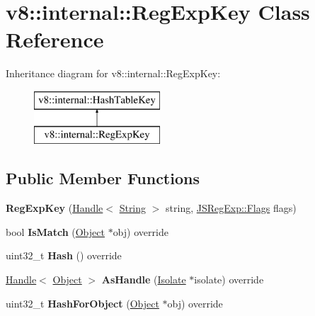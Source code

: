 \hypertarget{classv8_1_1internal_1_1_reg_exp_key}{}\section{v8\+:\+:internal\+:\+:Reg\+Exp\+Key Class Reference}
\label{classv8_1_1internal_1_1_reg_exp_key}
Inheritance diagram for v8\+:\+:internal\+:\+:Reg\+Exp\+Key\+:\begin{figure}[H]
\begin{center}
\leavevmode
\includegraphics[height=2.000000cm]{classv8_1_1internal_1_1_reg_exp_key}
\end{center}
\end{figure}
\subsection*{Public Member Functions}
\begin{DoxyCompactItemize}
\item 
{\bfseries Reg\+Exp\+Key} (\hyperlink{classv8_1_1internal_1_1_handle}{Handle}$<$ \hyperlink{classv8_1_1internal_1_1_string}{String} $>$ string, \hyperlink{classv8_1_1base_1_1_flags}{J\+S\+Reg\+Exp\+::\+Flags} flags)\hypertarget{classv8_1_1internal_1_1_reg_exp_key_a246a71b4ad1895699c71d654d56083b3}{}\label{classv8_1_1internal_1_1_reg_exp_key_a246a71b4ad1895699c71d654d56083b3}

\item 
bool {\bfseries Is\+Match} (\hyperlink{classv8_1_1internal_1_1_object}{Object} $\ast$obj) override\hypertarget{classv8_1_1internal_1_1_reg_exp_key_ad1255b383684119037cff47aa028d6fb}{}\label{classv8_1_1internal_1_1_reg_exp_key_ad1255b383684119037cff47aa028d6fb}

\item 
uint32\+\_\+t {\bfseries Hash} () override\hypertarget{classv8_1_1internal_1_1_reg_exp_key_a41c6f08f7503b0ea0464bb5bfe8993be}{}\label{classv8_1_1internal_1_1_reg_exp_key_a41c6f08f7503b0ea0464bb5bfe8993be}

\item 
\hyperlink{classv8_1_1internal_1_1_handle}{Handle}$<$ \hyperlink{classv8_1_1internal_1_1_object}{Object} $>$ {\bfseries As\+Handle} (\hyperlink{classv8_1_1internal_1_1_isolate}{Isolate} $\ast$isolate) override\hypertarget{classv8_1_1internal_1_1_reg_exp_key_a8d968e92670172e26a98fa62a9c8e6a5}{}\label{classv8_1_1internal_1_1_reg_exp_key_a8d968e92670172e26a98fa62a9c8e6a5}

\item 
uint32\+\_\+t {\bfseries Hash\+For\+Object} (\hyperlink{classv8_1_1internal_1_1_object}{Object} $\ast$obj) override\hypertarget{classv8_1_1internal_1_1_reg_exp_key_a196743d3efbd048e1b3ad6cde498a6a2}{}\label{classv8_1_1internal_1_1_reg_exp_key_a196743d3efbd048e1b3ad6cde498a6a2}

\end{DoxyCompactItemize}
